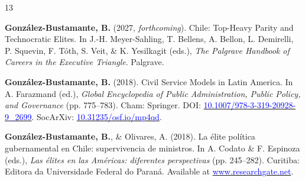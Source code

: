 \begin{publications}

\begin{benumerate}{13}

\item{{\bfseries González-Bustamante, B.} (2027, {\itshape forthcoming}). Chile: Top-Heavy Parity and Technocratic Elites. In J.-H. Meyer-Sahling, T. Bellens, A. Bellon, L. Demirelli, P. Squevin, F. Tóth, S. Veit, \& K. Yesilkagit (eds.), {\itshape The Palgrave Handbook of Careers in the Executive Triangle}. Palgrave.}\vspace{1mm}

\item{{\bfseries González-Bustamante, B.} (2018). Civil Service Models in Latin America. In A. Farazmand (ed.), {\itshape Global Encyclopedia of Public Administration, Public Policy, and Governance} (pp. 775--783). Cham: Springer. DOI: \href{https://doi.org/10.1007/978-3-319-20928-9\_2699}{\textcolor{blue}{10.1007/978-3-319-20928-9\_2699}}. SocArXiv: \href{https://doi.org/10.31235/osf.io/mp4qd}{\textcolor{blue}{10.31235/osf.io/mp4qd}}.}\vspace{1mm}


\item{{\bfseries González-Bustamante, B.}, \& Olivares, A. (2018). La élite política gubernamental en Chile: supervivencia de ministros. In A. Codato \& F. Espinoza (eds.), {\itshape Las élites en las Américas: diferentes perspectivas} (pp. 245--282). Curitiba: Editora da Universidade Federal do Paraná. Available at \href{https://www.researchgate.net/publication/325699783_Elites_en_las_Americas_diferentes_perspectivas_Elites_in_the_Americas_Different_Perspectives}{\textcolor{blue}{www.researchgate.net}}.}\vspace{1mm}



\end{benumerate}
\end{publications}
